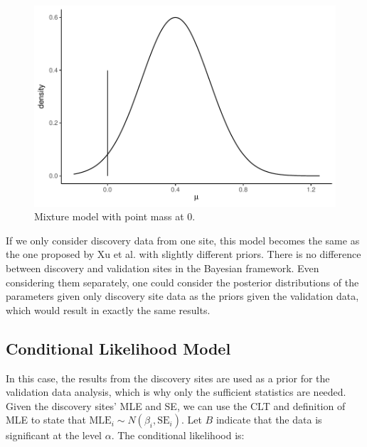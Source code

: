 \documentclass[AMA,STIX1COL]{WileyNJD-v2}\usepackage[]{graphicx}\usepackage[]{color}
\newenvironment{knitrout}{}{} %
\begin{document}
\begin{figure}
\caption{Mixture model with point mass at 0.}
\begin{knitrout}
\color{fgcolor}

{\centering \includegraphics[width=6in]{figure/unnamed-chunk-2-1} 

}



\end{knitrout}
\end{figure}

If we only consider discovery data from one site, this model becomes the same as the one proposed by Xu et al.\cite{xu2011bayesian} with slightly different priors. There is no difference between discovery and validation sites in the Bayesian framework. Even considering them separately, one could consider the posterior distributions of the parameters given only discovery site data as the priors given the validation data, which would result in exactly the same results. 

\subsection{Conditional Likelihood Model}

In this case, the results from the discovery sites are used as a prior for the validation data analysis, which is why only the sufficient statistics are needed. Given the discovery sites' MLE and SE, we can use the CLT and definition of MLE to state that $\text{MLE}_i \sim N(\beta_i, \text{SE}_i)$. Let $B$ indicate that the data is significant at the level $\alpha$. The conditional likelihood is:
\end{document}
